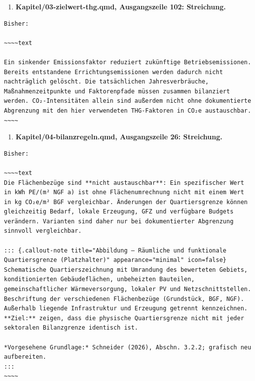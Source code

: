 \documentclass[
  ngerman,
  a4paper,
  DIV=11]{scrreprt}
\providecommand{\tightlist}{%
  \setlength{\itemsep}{0pt}\setlength{\parskip}{0pt}}
\begin{document}
\begin{enumerate}
\def\labelenumi{\arabic{enumi}.}
\setcounter{enumi}{107}
\tightlist
\item
  \textbf{Kapitel/03-zielwert-thg.qmd, Ausgangszeile 102: Streichung.}
\end{enumerate}

\begin{verbatim}
Bisher:

~~~~text

Ein sinkender Emissionsfaktor reduziert zukünftige Betriebsemissionen. Bereits entstandene Errichtungsemissionen werden dadurch nicht nachträglich gelöscht. Die tatsächlichen Jahresverbräuche, Maßnahmenzeitpunkte und Faktorenpfade müssen zusammen bilanziert werden. CO₂-Intensitäten allein sind außerdem nicht ohne dokumentierte Abgrenzung mit den hier verwendeten THG-Faktoren in CO₂e austauschbar.
~~~~
\end{verbatim}

\begin{enumerate}
\def\labelenumi{\arabic{enumi}.}
\setcounter{enumi}{108}
\tightlist
\item
  \textbf{Kapitel/04-bilanzregeln.qmd, Ausgangszeile 26: Streichung.}
\end{enumerate}

\begin{verbatim}
Bisher:

~~~~text
Die Flächenbezüge sind **nicht austauschbar**: Ein spezifischer Wert in kWh PE/(m² NGF a) ist ohne Flächenumrechnung nicht mit einem Wert in kg CO₂e/m² BGF vergleichbar. Änderungen der Quartiersgrenze können gleichzeitig Bedarf, lokale Erzeugung, GFZ und verfügbare Budgets verändern. Varianten sind daher nur bei dokumentierter Abgrenzung sinnvoll vergleichbar.

::: {.callout-note title="Abbildung – Räumliche und funktionale Quartiersgrenze (Platzhalter)" appearance="minimal" icon=false}
Schematische Quartierszeichnung mit Umrandung des bewerteten Gebiets, konditionierten Gebäudeflächen, unbeheizten Bauteilen, gemeinschaftlicher Wärmeversorgung, lokaler PV und Netzschnittstellen. Beschriftung der verschiedenen Flächenbezüge (Grundstück, BGF, NGF). Außerhalb liegende Infrastruktur und Erzeugung getrennt kennzeichnen. **Ziel:** zeigen, dass die physische Quartiersgrenze nicht mit jeder sektoralen Bilanzgrenze identisch ist.

*Vorgesehene Grundlage:* Schneider (2026), Abschn. 3.2.2; grafisch neu aufbereiten.
:::
~~~~
\end{verbatim}
\end{document}
